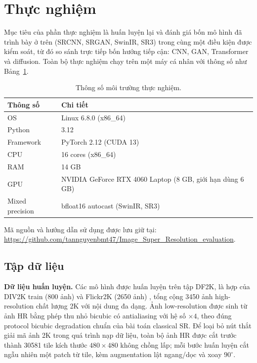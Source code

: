 \section{Thực nghiệm}

Mục tiêu của phần thực nghiệm là huấn luyện lại và đánh giá bốn mô hình đã trình
bày ở trên (SRCNN, SRGAN, SwinIR, SR3) trong cùng một điều kiện được kiểm soát,
từ đó so sánh trực tiếp bốn hướng tiếp cận: CNN, GAN, Transformer và diffusion.
Toàn bộ thực nghiệm chạy trên một máy cá nhân với thông số như Bảng~\ref{tab:environment}.

\begin{table}[H]
\centering
\caption{Thông số môi trường thực nghiệm.}
\label{tab:environment}
\begin{tabular}{|l|l|}
\hline
\textbf{Thông số} & \textbf{Chi tiết} \\ \hline
OS & Linux 6.8.0 (x86\_64) \\ \hline
Python & 3.12 \\ \hline
Framework & PyTorch 2.12 (CUDA 13) \\ \hline
CPU & 16 cores (x86\_64) \\ \hline
RAM & 14 GB \\ \hline
GPU & NVIDIA GeForce RTX 4060 Laptop (8 GB, giới hạn dùng 6 GB) \\ \hline
Mixed precision & bfloat16 autocast (SwinIR, SR3) \\ \hline
\end{tabular}
\end{table}

Mã nguồn và hướng dẫn sử dụng được lưu giữ tại: \url{https://github.com/tannguyenbmt47/Image_Super_Resolution_evaluation}.

\subsection{Tập dữ liệu}
\label{sec:datasets}

\textbf{Dữ liệu huấn luyện.} Các mô hình được huấn luyện trên tập DF2K, là hợp của
DIV2K train (800 ảnh) và Flickr2K (2650 ảnh) \cite{agustsson2017ntire}, tổng cộng 3450 ảnh high-resolution
chất lượng 2K với nội dung đa dạng. Ảnh low-resolution được sinh từ ảnh HR bằng
phép thu nhỏ bicubic có antialiasing với hệ số $\times 4$, theo đúng protocol
bicubic degradation chuẩn của bài toán classical SR. Để loại bỏ nút thắt giải mã
ảnh 2K trong quá trình nạp dữ liệu, toàn bộ ảnh HR được cắt trước thành 30581
tile kích thước $480 \times 480$ không chồng lấp; mỗi bước huấn luyện cắt ngẫu
nhiên một patch từ tile, kèm augmentation lật ngang/dọc và xoay $90^{\circ}$.

